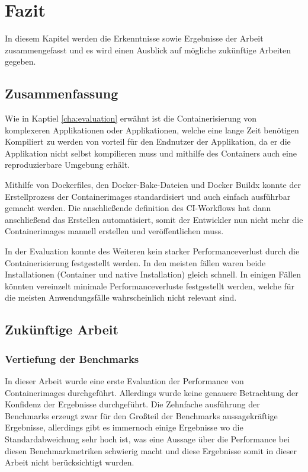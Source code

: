 \chapter{Fazit}

In diesem Kapitel werden die Erkenntnisse sowie Ergebnisse der Arbeit zusammengefasst und es wird einen Ausblick auf mögliche zukünftige Arbeiten gegeben. 

\section{Zusammenfassung}

Wie in Kaptiel \ref{cha:evaluation} erwähnt ist die Containerisierung von komplexeren Applikationen oder Applikationen, welche eine lange Zeit benötigen Kompiliert zu werden von vorteil für den Endnutzer der Applikation, da er die Applikation nicht selbst kompilieren muss und mithilfe des Containers auch eine reproduzierbare Umgebung erhält. 

Mithilfe von Dockerfiles, den Docker-Bake-Dateien und Docker Buildx konnte der Erstellprozess der Containerimages standardisiert und auch einfach ausführbar gemacht werden. Die anschließende definition des CI-Workflows hat dann anschließend das Erstellen automatisiert, somit der Entwickler nun nicht mehr die Containerimages manuell erstellen und veröffentlichen muss. 

In der Evaluation konnte des Weiteren kein starker Performanceverlust durch die Containerisierung festgestellt werden. In den meisten fällen waren beide Installationen (Container und native Installation) gleich schnell. In einigen Fällen könnten vereinzelt minimale Performanceverluste festgestellt werden, welche für die meisten Anwendungsfälle wahrscheinlich nicht relevant sind.      

\section{Zukünftige Arbeit}

\subsection{Vertiefung der Benchmarks}

In dieser Arbeit wurde eine erste Evaluation der Performance von Containerimages durchgeführt. Allerdings wurde keine genauere Betrachtung der Konfidenz der Ergebnisse durchgeführt. Die Zehnfache ausführung der Benchmarks erzeugt zwar für den Großteil der Benchmarks aussagekräftige Ergebnisse, allerdings gibt es immernoch einige Ergebnisse wo die Standardabweichung sehr hoch ist, was eine Aussage über die Performance bei diesen Benchmarkmetriken schwierig macht und diese Ergebnisse somit in dieser Arbeit nicht berücksichtigt wurden.

